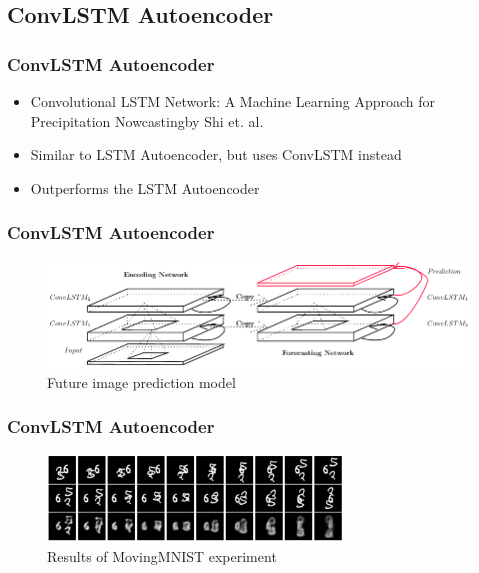  \subsection{ConvLSTM Autoencoder}
  \begin{frame}
   \frametitle{ConvLSTM Autoencoder}
   
   \begin{itemize}
    \item<1-> \glqq Convolutional LSTM Network: A Machine Learning Approach for Precipitation Nowcasting\grqq by Shi et. al. \citep{Shi2015}
    \item<2-> Similar to LSTM Autoencoder, but uses ConvLSTM instead
    \item<3-> Outperforms the LSTM Autoencoder
   \end{itemize}
   
  \end{frame}
  \begin{frame}
   \frametitle{ConvLSTM Autoencoder}
   
   \begin{figure}[H]
    \includegraphics[width=1.0\textwidth]{../Images/shi.png}
    \centering
    \caption{Future image prediction model \citep{Shi2015}}
    \label{fig:convlstm_architecture}
   \end{figure}
  
  \end{frame}
  \begin{frame}
   \frametitle{ConvLSTM Autoencoder}
   
   \begin{figure}[H]
    \includegraphics[width=0.7\textwidth]{../Images/shi_results_mnist.png}
    \centering
    \caption{Results of MovingMNIST experiment \citep{Srivastava2015}}
    \label{fig:lstm_architecture}
   \end{figure}  
  
  \end{frame}
 
